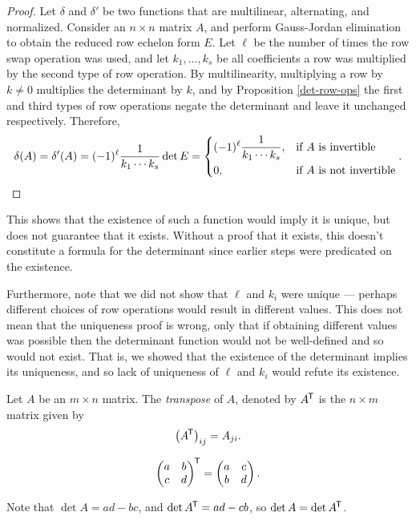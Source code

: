 \begin{proof}
    Let $\delta$ and $\delta'$ be two functions that are multilinear, alternating, and normalized. Consider an $n \times n$ matrix $A$, and perform Gauss-Jordan elimination to obtain the reduced row echelon form $E$. Let $\ell$ be the number of times the row swap operation was used, and let $k_1, \ldots, k_s$ be all coefficients a row was multiplied by the second type of row operation. By multilinearity, multiplying a row by $k \neq 0$ multiplies the determinant by $k$, and by Proposition \ref{det-row-ops} the first and third types of row operations negate the determinant and leave it unchanged respectively. Therefore,
    \[\delta(A) = \delta'(A) = (-1)^{\ell}\frac{1}{k_1\cdots k_s}\det E = \begin{dcases}
        (-1)^{\ell}\frac{1}{k_1\cdots k_s}, & \textrm{if $A$ is invertible} \\
        0, & \textrm{if $A$ is not invertible}
    \end{dcases}.\]
\end{proof}

\begin{rmk}
    This shows that the existence of such a function would imply it is unique, but does not guarantee that it exists. Without a proof that it exists, this doesn't constitute a formula for the determinant since earlier steps were predicated on the existence.

    Furthermore, note that we did not show that $\ell$ and $k_i$ were unique --- perhaps different choices of row operations would result in different values. This does not mean that the uniqueness proof is wrong, only that if obtaining different values was possible then the determinant function would not be well-defined and so would not exist. That is, we showed that the existence of the determinant implies its uniqueness, and so lack of uniqueness of $\ell$ and $k_i$ would refute its existence.
\end{rmk}

\begin{defn}
    Let $A$ be an $m \times n$ matrix. The \emph{transpose} of $A$, denoted by ${A}^{\mkern-1.5mu\mathsf{T}}$ is the $n \times m$ matrix given by
    \[\left({A}^{\mkern-1.5mu\mathsf{T}}\right)_{ij} = A_{ji}.\]
\end{defn}

\begin{exmp}
    \[{\begin{pmatrix}
        a & b \\ c & d
    \end{pmatrix}}^{\mkern-1.5mu\mathsf{T}} = \begin{pmatrix}
        a & c \\ b & d
    \end{pmatrix}.\]

    Note that $\det A = ad - bc$, and $\det{A}^{\mkern-1.5mu\mathsf{T}} = ad - cb$, so $\det A = \det{A}^{\mkern-1.5mu\mathsf{T}}$.
\end{exmp}

